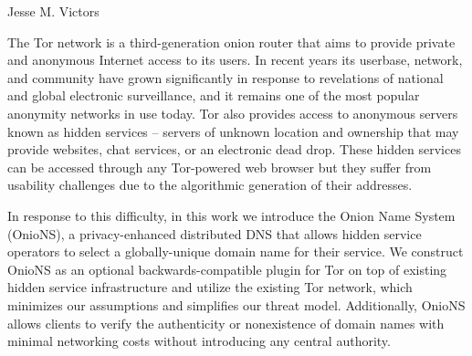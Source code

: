 \begin{publicabstract}
\centerline{Jesse M. Victors}
\vspace{12pt}

The Tor network is a third-generation onion router that aims to provide private and anonymous Internet access to its users. In recent years its userbase, network, and community have grown significantly in response to revelations of national and global electronic surveillance, and it remains one of the most popular anonymity networks in use today. Tor also provides access to anonymous servers known as hidden services -- servers of unknown location and ownership that may provide websites, chat services, or an electronic dead drop. These hidden services can be accessed through any Tor-powered web browser but they suffer from usability challenges due to the algorithmic generation of their addresses.

In response to this difficulty, in this work we introduce the Onion Name System (OnioNS), a privacy-enhanced distributed DNS that allows hidden service operators to select a globally-unique domain name for their service. We construct OnioNS as an optional backwards-compatible plugin for Tor on top of existing hidden service infrastructure and utilize the existing Tor network, which minimizes our assumptions and simplifies our threat model. Additionally, OnioNS allows clients to verify the authenticity or nonexistence of domain names with minimal networking costs without introducing any central authority.

\end{publicabstract}
